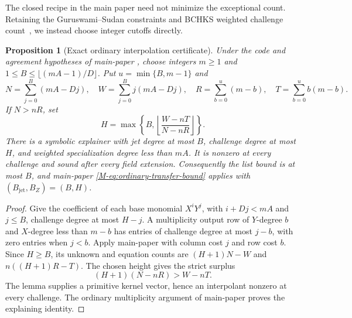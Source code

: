\documentclass[11pt,letterpaper]{article}
\newtheorem{proposition}[proposition]{Proposition}
\theoremstyle{definition}
\newcommand{\Bjet}{B_{\mathrm{jet}}}
\newcommand{\BZ}{B_Z}
\begin{document}
The closed recipe in the main paper need not minimize the exceptional
count. Retaining the Guruswami--Sudan constraints and BCHKS weighted
challenge count~\cite{GS99,BCHKS25}, we instead choose integer cutoffs
directly.

\begin{proposition}[Exact ordinary interpolation certificate]
\label{prop:johnson-finite-certificate}
Under the code and agreement hypotheses of main-paper
, choose integers $m\ge1$ and
$1\le B\le\lfloor(mA-1)/D\rfloor$. Put $u=\min\{B,m-1\}$ and
\[
 N=\sum_{j=0}^B(mA-Dj),\quad W=\sum_{j=0}^B j(mA-Dj),\quad
 R=\sum_{b=0}^u(m-b),\quad T=\sum_{b=0}^u b(m-b).
\]
If $N>nR$, set
\begin{equation}
 H=\max\left\{B,\left\lfloor\frac{W-nT}{N-nR}\right\rfloor\right\}.
 \label{eq:johnson-finite-height}
\end{equation}
There is a symbolic explainer with jet degree at most $B$, challenge
degree at most $H$, and weighted specialization degree less than $mA$.
It is nonzero at every challenge and sound after every field extension.
Consequently the list bound is at most $B$, and main-paper
\eqref{M-eq:ordinary-transfer-bound} applies with
$(\Bjet,\BZ)=(B,H)$.
\end{proposition}
\begin{proof}
Give the coefficient of each base monomial $X^iY^j$, with $i+Dj<mA$
and $j\le B$, challenge degree at most $H-j$. A multiplicity output row
of $Y$-degree $b$ and $X$-degree less than $m-b$ has entries of challenge
degree at most $j-b$, with zero entries when $j<b$.
Apply main-paper  with column cost
$j$ and row cost $b$. Since $H\ge B$, its unknown and equation counts are
$(H+1)N-W$ and $n((H+1)R-T)$. The chosen height gives the strict surplus
\[
 (H+1)(N-nR)>W-nT.
\]
The lemma supplies a primitive kernel vector, hence an interpolant
nonzero at every challenge. The ordinary multiplicity argument of
main-paper  proves the explaining
identity.
\end{proof}
\end{document}
